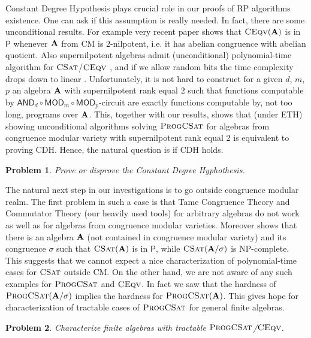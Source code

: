 \documentclass[11pt,a4paper]{amsart}
\newtheorem{prob}{Problem}
\newcommand{\npc}{\textsf{NP}-complete\xspace}
\newcommand{\ptime}{\textsf{P}\xspace}
\newcommand{\rptime}{\textsf{RP}\xspace}
\newcommand{\m}[1]{{\uppercase {\bf{#1}}}}
\newcommand{\gProblem}[2]{\ensuremath{\operatorname{\textup{\textsc{{#2}}}}
		\ifthenelse{\equal{#1}{}}{}{\!\left( {#1} \right)}}}
\newcommand{\ceqv}[1]{\gProblem{#1}{CEqv}}
\newcommand{\csat}[1]{\gProblem{#1}{CSat}}
\newcommand{\progcsat}[1]{\gProblem{#1}{ProgCSat}}
\newcommand{\ccand}{\mathsf{AND}}
\newcommand{\ccmod}{\mathsf{MOD}}
\begin{document}
Constant Degree Hypothesis plays crucial role in our proofs of \rptime algorithms existence. One can ask if this assumption is really needed. In fact, there are some  unconditional results. For example very recent paper \cite{KawalekKK19} shows that \ceqv{\m A} is in $\ptime$ whenever $\m A$  from CM is $2$-nilpotent, i.e. it has abelian congruence with abelian quotient. Also supernilpotent algebras admit (unconditional) polynomial-time algorithm for \csat{}/\ceqv{} \cite{aichmud-2010, komp2017, IdziakK22}, and if we allow random bits the time complexity drops down to linear \cite{KawalekK}. Unfortunately, it is not hard to construct for a given $d$, $m$, $p$ an algebra $\m A$ with supernilpotent rank equal $2$ such that functions computable by $\ccand_d \circ \ccmod_m \circ \ccmod_p$-circuit are exactly functions computable by, not too long, programs over $\m A$.  This, together with our results, shows that (under ETH) showing unconditional algorithms solving \progcsat{} for algebras from congruence modular variety with supernilpotent rank equal $2$ is equivalent to proving CDH. Hence, the natural question is if CDH holds.
\begin{prob}
Prove or disprove the Constant Degree Hyphothesis.
 \end{prob}

The natural next step in our investigations is to go outside congruence modular realm. The first problem in such a case is that Tame Congruence Theory and Commutator Theory (our heavily used tools) for arbitrary algebras do not work as well as for algebras from congruence modular varieties.  Moreover \cite[Example 2.8]{IdziakK22} shows that there is an algebra $\m A$ (not contained in congruence modular variety) and its congruence $\sigma$ such that $\csat{\m A}$ is in $\ptime$, while $\csat{\m A/\sigma}$ is \npc. This suggests that we cannot expect a nice characterization of polynomial-time cases for \csat{} outside CM. On the other hand, we are not aware of any such examples for \progcsat{} and \ceqv{}. In fact we saw that the hardness of $\progcsat{\m A/\sigma}$ implies the hardness for $\progcsat{\m A}$. This gives hope for characterization of tractable cases of \progcsat{} for general finite algebras.

\begin{prob}
 Characterize finite algebras with tractable \progcsat{}/\ceqv{}.
 \end{prob}
 


  
\end{document}
